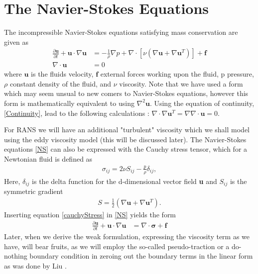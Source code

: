 \documentclass[11pt]{article}
\begin{document}
{%
\section{The Navier-Stokes Equations}
The incompressible Navier-Stokes equations satisfying mass conservation are given as
\begin{align}
\label{NS}
\frac{\partial\mathbf{u}}{\partial t} + \mathbf{u}\cdot\nabla \mathbf{u} &= 
-\frac{1}{\rho}  \nabla p  + 
\nabla \cdot \left[\nu \left(\nabla\mathbf{u} + \nabla\mathbf{u}^T \right)  \right]
+ \mathbf{f} \\
\label{Continuity}
\nabla \cdot\mathbf{u} &= 0
\end{align}
where $\mathbf{u}$ is the fluids velocity, $\mathbf{f}$ external forces working upon the 
fluid, p pressure, $\rho$ constant density of the fluid, and $\nu$ viscosity. Note that we
have used a form which may seem unsual to new comers to Navier-Stokes equations, however
this form is mathematically equivalent to using $\nabla^2\mathbf{u}$. Using the equation
of continuity, \eqref{Continuity}, lead to the following calculations : $\nabla \cdot \nabla
\mathbf{u}^T = \nabla \nabla \cdot \mathbf{u} = 0.$ 

For RANS we will have an additional "turbulent" viscosity which we shall model using the 
eddy viscosity model (this will be discussed later). The Navier-Stokes equations \eqref{NS} 
can also be expressed with the Cauchy stress tensor, which for a Newtonian fluid is defined as 
\begin{align}
\label{cauchyStress}
\sigma_{ij} =  2\nu S_{ij} - \frac{p}{\rho}\delta_{ij},
\end{align}
Here, $\delta_{ij}$ is the delta function for the d-dimensional vector field \textbf{u} and 
$S_{ij}$ is the symmetric gradient
\begin{align}
\label{symGrad}
S = \frac{1}{2} (\nabla \mathbf{u} + \nabla \mathbf{u}^T).
\end{align}
Inserting equation \eqref{cauchyStress} in \eqref{NS} yields the form
\begin{align}
\label{NSwithSigma}
\frac{\partial\mathbf{u}}{\partial t} + \mathbf{u}\cdot\nabla \mathbf{u} &=  
\nabla\cdot \mathbf{\sigma} + \mathbf{f}
\end{align}
Later, when we derive the weak formulation, expressing the viscosity term as we have, will
bear fruits, as we will employ the so-called pseudo-traction or a do-nothing boundary 
condition in zeroing out the boundary terms in the linear form as was done by Liu \cite{11}.



}
\end{document}
